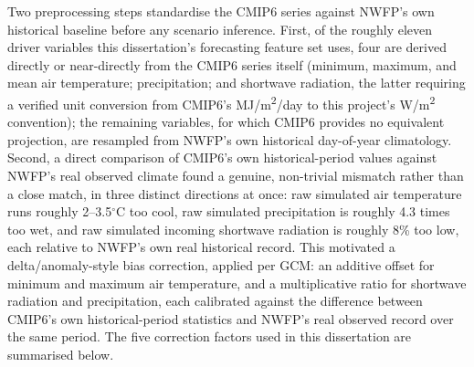 Two preprocessing steps standardise the CMIP6 series against NWFP's own historical baseline before
any scenario inference. First, of the roughly eleven driver variables this dissertation's
forecasting feature set uses, four are derived directly or near-directly from the CMIP6 series
itself (minimum, maximum, and mean air temperature; precipitation; and shortwave radiation, the
latter requiring a verified unit conversion from CMIP6's MJ/m\textsuperscript{2}/day to this
project's W/m\textsuperscript{2} convention); the remaining variables, for which CMIP6 provides no
equivalent projection, are resampled from NWFP's own historical day-of-year climatology. Second, a
direct comparison of CMIP6's own historical-period values against NWFP's real observed climate
found a genuine, non-trivial mismatch rather than a close match, in three distinct directions at
once: raw simulated air temperature runs roughly 2--3.5$^\circ$C too cool, raw simulated
precipitation is roughly 4.3 times too wet, and raw simulated incoming shortwave radiation is
roughly 8\% too low, each relative to NWFP's own real historical record. This motivated a
delta/anomaly-style bias correction, applied per GCM: an additive offset for minimum and maximum
air temperature, and a multiplicative ratio for shortwave radiation and precipitation, each
calibrated against the difference between CMIP6's own historical-period statistics and NWFP's real
observed record over the same period. The five correction factors used in this dissertation are
summarised below.

\begin{table}[h]
\centering
{}
\caption{Per-GCM bias-correction factors applied to CMIP6 driver variables against NWFP's own
historical baseline.}
\end{table}

